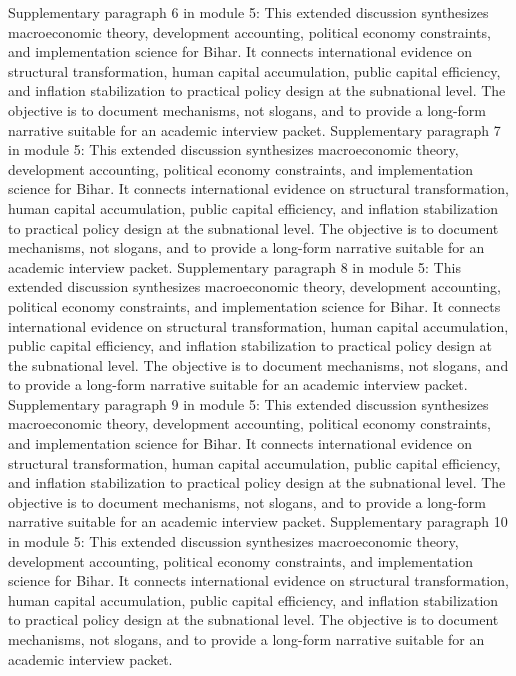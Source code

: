 \documentclass[preprint,12pt]{elsarticle}
\begin{document}
Supplementary paragraph 6 in module 5: This extended discussion synthesizes macroeconomic theory, development accounting, political economy constraints, and implementation science for Bihar. It connects international evidence on structural transformation, human capital accumulation, public capital efficiency, and inflation stabilization to practical policy design at the subnational level. The objective is to document mechanisms, not slogans, and to provide a long-form narrative suitable for an academic interview packet.
Supplementary paragraph 7 in module 5: This extended discussion synthesizes macroeconomic theory, development accounting, political economy constraints, and implementation science for Bihar. It connects international evidence on structural transformation, human capital accumulation, public capital efficiency, and inflation stabilization to practical policy design at the subnational level. The objective is to document mechanisms, not slogans, and to provide a long-form narrative suitable for an academic interview packet.
Supplementary paragraph 8 in module 5: This extended discussion synthesizes macroeconomic theory, development accounting, political economy constraints, and implementation science for Bihar. It connects international evidence on structural transformation, human capital accumulation, public capital efficiency, and inflation stabilization to practical policy design at the subnational level. The objective is to document mechanisms, not slogans, and to provide a long-form narrative suitable for an academic interview packet.
Supplementary paragraph 9 in module 5: This extended discussion synthesizes macroeconomic theory, development accounting, political economy constraints, and implementation science for Bihar. It connects international evidence on structural transformation, human capital accumulation, public capital efficiency, and inflation stabilization to practical policy design at the subnational level. The objective is to document mechanisms, not slogans, and to provide a long-form narrative suitable for an academic interview packet.
Supplementary paragraph 10 in module 5: This extended discussion synthesizes macroeconomic theory, development accounting, political economy constraints, and implementation science for Bihar. It connects international evidence on structural transformation, human capital accumulation, public capital efficiency, and inflation stabilization to practical policy design at the subnational level. The objective is to document mechanisms, not slogans, and to provide a long-form narrative suitable for an academic interview packet.
\end{document}
